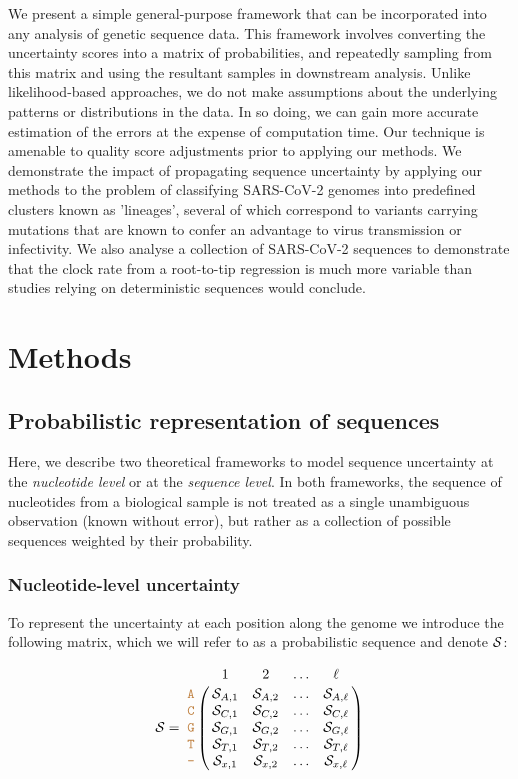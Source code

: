 \documentclass[10pt]{article}
\begin{document}
We present a simple general-purpose framework that can be incorporated into any analysis of genetic sequence data.
This framework involves converting the uncertainty scores into a matrix of probabilities, and repeatedly sampling from this matrix and using the resultant samples in downstream analysis.
Unlike likelihood-based approaches, we do not make assumptions about the underlying patterns or distributions in the data.
In so doing, we can gain more accurate estimation of the errors at the expense of computation time.
Our technique is amenable to quality score adjustments prior to applying our methods.
We demonstrate the impact of propagating sequence uncertainty by applying our methods to the problem of classifying SARS-CoV-2 genomes into predefined clusters known as 'lineages', several of which correspond to variants carrying mutations that are known to confer an advantage to virus transmission or infectivity.
We also analyse a collection of SARS-CoV-2 sequences to demonstrate that the clock rate from a root-to-tip regression is much more variable than studies relying on deterministic sequences would conclude.



\section{Methods}

\subsection{Probabilistic representation of sequences}

Here, we describe two theoretical frameworks to model sequence uncertainty at the \emph{nucleotide level} or at the \emph{sequence level}.
In both frameworks, the sequence of nucleotides from a biological sample is not treated as a single unambiguous observation (known without error), but rather as a collection of possible sequences weighted by their probability.

\subsubsection{Nucleotide-level uncertainty}

To represent the uncertainty at each position along the genome we introduce the following matrix, which we will refer to as a probabilistic sequence and denote $\mathcal{S}$:

\begin{equation}
\nps = \bordermatrix{   & 1 & 2 & \ldots & \ell \cr
                \sq{A} & \nps_{A, 1} & \nps_{A, 2} & \ldots & \nps_{A, \ell} \cr
                \sq{C} & \nps_{C, 1} & \nps_{C, 2} & \ldots & \nps_{C, \ell} \cr
                \sq{G} & \nps_{G, 1} & \nps_{G, 2} & \ldots & \nps_{G, \ell} \cr
                \sq{T} & \nps_{T, 1} & \nps_{T, 2} & \ldots & \nps_{T, \ell} \cr 
                \sq{-} & \nps_{x, 1} & \nps_{x, 2} & \ldots & \nps_{x, \ell} \cr 
}\label{eq:nps}
\end{equation}
\end{document}
